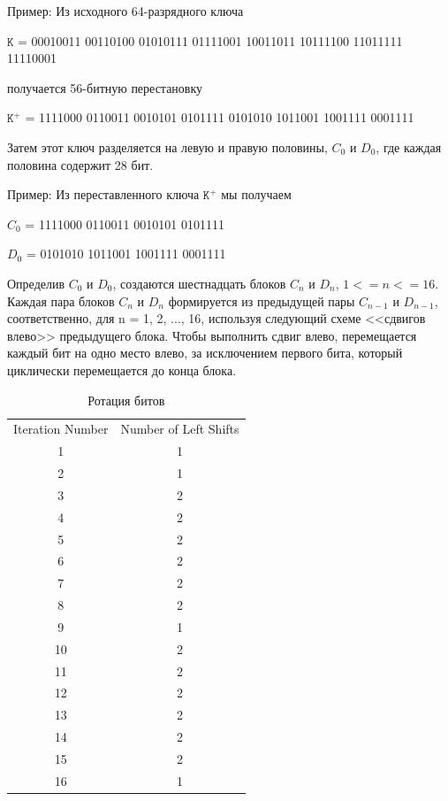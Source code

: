 Пример: Из исходного 64-разрядного ключа

$\texttt{K}$ = 00010011 00110100 01010111 01111001 10011011 10111100 11011111 11110001

получается 56-битную перестановку

$\texttt{K}^{+}$ = 1111000 0110011 0010101 0101111 0101010 1011001 1001111 0001111

Затем этот ключ разделяется на левую и правую половины, $C_0$ и $D_0$, где каждая половина содержит 28 бит.

Пример: Из переставленного ключа $\texttt{K}^{+}$ мы получаем

$C_0$ = 1111000 0110011 0010101 0101111

$D_0$ = 0101010 1011001 1001111 0001111

Определив $C_0$ и $D_0$, создаются шестнадцать блоков $C_n$ и $D_n$, $1<=n<=16$. 
Каждая пара блоков $C_n$ и $D_n$ формируется из предыдущей пары $C_{n-1}$ и $D_{n-1}$, соответственно, для n = 1, 2, ..., 16, используя следующий схеме <<сдвигов влево>> предыдущего блока. 
Чтобы выполнить сдвиг влево, перемещается каждый бит на одно место влево, за исключением первого бита, который циклически перемещается до конца блока.

\begin{table}[ht!]
    \begin{center}
		\captionsetup{justification=raggedright,singlelinecheck=off}
		\caption{\label{tbl:rot} Ротация битов}
        \begin{tabular}{ |c c| }
Iteration Number  &  Number of Left Shifts \\
                          1    &      1 \\
                          2     &     1 \\
                          3     &     2 \\
                          4     &     2 \\
                          5     &     2 \\
                          6     &     2 \\
                          7    &      2 \\
                          8     &     2 \\
                          9     &     1 \\
                         10     &     2 \\
                         11      &    2 \\
                         12     &     2 \\
                         13     &     2 \\
                         14    &      2 \\
                         15     &     2 \\
                         16      &    1
        \end{tabular}
    \end{center}
\end{table}


